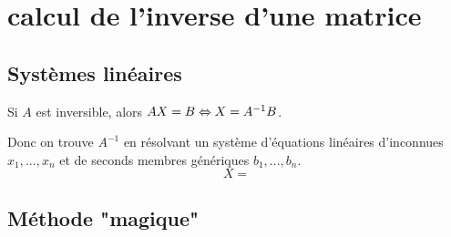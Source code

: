 \documentclass[../main.tex]{subfile}
\begin{document}
\section{calcul de l'inverse d'une matrice}
\subsection{Systèmes linéaires}
\begin{prop}
	Si $A$ est inversible, alors $AX = B \Leftrightarrow X = A^{-1}B$.
\end{prop}
	Donc on trouve $A^{-1}$ en résolvant un système d'équations linéaires d'inconnues $x_1, ..., x_n$ et de seconds membres génériques $b_1, ..., b_n$.\\
	$$X = 
	$$


\begin{ex}
\end{ex}

\subsection{Méthode "magique"}
\end{document}

